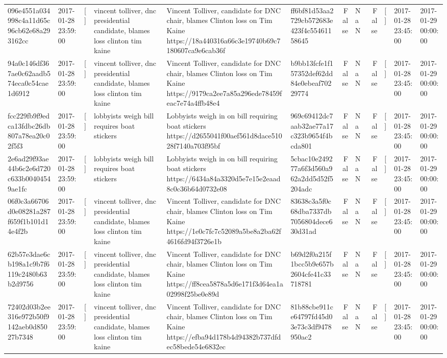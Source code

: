 \begin{tabular}{llllllrlrlll}
096e4551a034998c4a11d65c96cb62e68a293162cc & 2017-01-28 23:59:00 & [] & vincent tolliver, dnc presidential candidate, blames loss clinton tim kaine & Vincent Tolliver, candidate for DNC chair, blames Clinton loss on Tim Kaine https://18a440316a66c3e19740b69c7180607ca9e6cab36f & ff6bf81d53aa2729cb572683e423f4c55461158645 & False & NaN & False & [] & 2017-01-28 23:45:00 & 2017-01-29 00:00:00 \\
94a0c146df367ae0c62aadb574eca0c54cae1d6912 & 2017-01-28 23:59:00 & [] & vincent tolliver, dnc presidential candidate, blames loss clinton tim kaine & Vincent Tolliver, candidate for DNC chair, blames Clinton loss on Tim Kaine https://9179ca2ee7a85a296ede78459feac7e74a4ffb48e4 & b9bb13fcfe1f157352def62dd84e0ebeaf70229774 & False & NaN & False & [] & 2017-01-28 23:45:00 & 2017-01-29 00:00:00 \\
fcc229fb9f9edca13fdbc26db807a78ea20c02f5f3 & 2017-01-28 23:59:00 & [] & lobbyists weigh bill requires boat stickers & Lobbyists weigh in on bill requiring boat stickers https://d2655041f00aef561d8dace51028f7140a703f95bf & 969c69412dc7aab32ae77a17c323b9654f4bcda801 & False & NaN & False & [] & 2017-01-28 23:45:00 & 2017-01-29 00:00:00 \\
2e6ad29f93ae44b6c2e6d720c633b00404549ae1fc & 2017-01-28 23:59:00 & [] & lobbyists weigh bill requires boat stickers & Lobbyists weigh in on bill requiring boat stickers https://6434a84a3320d5e7e15e2eaad8c0c36b64d0732e08 & 5cbac10e249277a6f3d560a962a2dd5d52f5204adc & False & NaN & False & [] & 2017-01-28 23:45:00 & 2017-01-29 00:00:00 \\
06f0c3a66706d0e08281a287f659f1b101d14e4f2b & 2017-01-28 23:59:00 & [] & vincent tolliver, dnc presidential candidate, blames loss clinton tim kaine & Vincent Tolliver, candidate for DNC chair, blames Clinton loss on Tim Kaine https://1e0c7fc7c52089a5be8a2ba62f4616fd94f3726e1b & 83638c3a5f0c68dba7337db7056804dece630d31ad & False & NaN & False & [] & 2017-01-28 23:45:00 & 2017-01-29 00:00:00 \\
62b57e3dae6cb198a1c9b7f6119c2480b63b2d9756 & 2017-01-28 23:59:00 & [] & vincent tolliver, dnc presidential candidate, blames loss clinton tim kaine & Vincent Tolliver, candidate for DNC chair, blames Clinton loss on Tim Kaine https://ff8cea5878a5d6e171f3d64ea1a02998f25be0e89d & b69d2f0a215f1bcc5b9e657b2604cfe41c33718781 & False & NaN & False & [] & 2017-01-28 23:45:00 & 2017-01-29 00:00:00 \\
72402d03b2ee316e972b50f9142aeb0d85027b7348 & 2017-01-28 23:59:00 & [] & vincent tolliver, dnc presidential candidate, blames loss clinton tim kaine & Vincent Tolliver, candidate for DNC chair, blames Clinton loss on Tim Kaine https://efba94d178b4d94382b737dfdec58bede54e6832ec & 81b88cbe911ce64797fd45d03e73c3df9478950ac2 & False & NaN & False & [] & 2017-01-28 23:45:00 & 2017-01-29 00:00:00 \\

\end{tabular}
